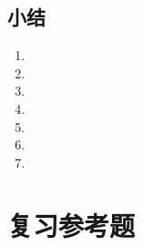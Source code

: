 \begin{Exercise}
  \begin{question}
    \item 
    \item 
    \item 
    \item 
    \item 
    \item 
    \item 
    \item 
    \item 
    \item 
    \item 
    \item 
    \item 
    \item 
    \item 
    \item 
    \item 
    \item 
    \item 
    \item 
    \item 
    \item 
    \item 
  \end{question}
\end{Exercise}


\section*{小结}
\begin{enumerate}[C、,itemindent=4.5em]
  \item 
  \item 
  \item 
  \item 
  \item 
  \item 
  \item 
\end{enumerate}
\chapter*{复习参考题}
